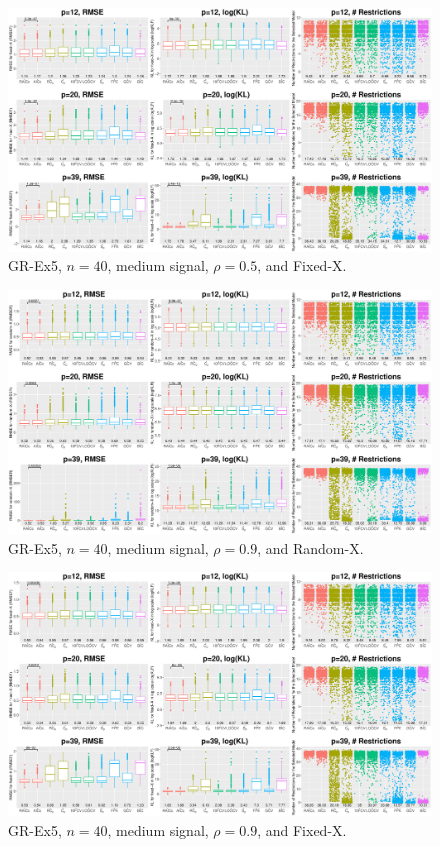 \begin{figure}[!ht]
\centering
\includegraphics[width=\textwidth]{figures/supplement/fixedx_GR-Ex5_n40_msnr_rho05.eps}
\caption{GR-Ex5, $n=40$, medium signal, $\rho=0.5$, and Fixed-X.}
\end{figure}
\clearpage
\begin{figure}[!ht]
\centering
\includegraphics[width=\textwidth]{figures/supplement/randomx_GR-Ex5_n40_msnr_rho09.eps}
\caption{GR-Ex5, $n=40$, medium signal, $\rho=0.9$, and Random-X.}
\end{figure}
\begin{figure}[!ht]
\centering
\includegraphics[width=\textwidth]{figures/supplement/fixedx_GR-Ex5_n40_msnr_rho09.eps}
\caption{GR-Ex5, $n=40$, medium signal, $\rho=0.9$, and Fixed-X.}
\end{figure}
